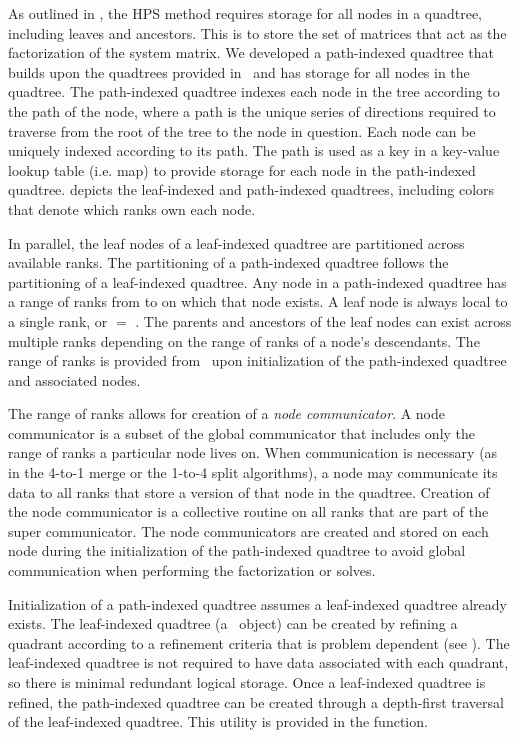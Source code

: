 As outlined in \cite{chipman2024fast}, the HPS method requires storage for all nodes in a quadtree, including leaves and ancestors. This is to store the set of matrices that act as the factorization of the system matrix. We developed a path-indexed quadtree that builds upon the quadtrees provided in \pforest\ and has storage for all nodes in the quadtree. The path-indexed quadtree indexes each node in the tree according to the path of the node, where a path is the unique series of directions required to traverse from the root of the tree to the node in question. Each node can be uniquely indexed according to its path. The path is used as a key in a key-value lookup table (i.e. map) to provide storage for each node in the path-indexed quadtree.  depicts the leaf-indexed and path-indexed quadtrees, including colors that denote which ranks own each node.

In parallel, the leaf nodes of a leaf-indexed quadtree are partitioned across available ranks. The partitioning of a path-indexed quadtree follows the partitioning of a leaf-indexed quadtree. Any node in a path-indexed quadtree has a range of ranks from \rfirst to \rlast on which that node exists. A leaf node is always local to a single rank, or \rfirst $=$ \rlast. The parents and ancestors of the leaf nodes can exist across multiple ranks depending on the range of ranks of a node's descendants. The range of ranks is provided from \pforest\ upon initialization of the path-indexed quadtree and associated nodes.

The range of ranks allows for creation of a {\em node communicator}. A node communicator is a subset of the global communicator that includes only the range of ranks a particular node lives on. When communication is necessary (as in the 4-to-1 merge or the 1-to-4 split algorithms), a node may communicate its data to all ranks that store a version of that node in the quadtree. Creation of the node communicator is a collective routine on all ranks that are part of the super communicator. The node communicators are created and stored on each node during the initialization of the path-indexed quadtree to avoid global communication when performing the factorization or solves.

Initialization of a path-indexed quadtree assumes a leaf-indexed quadtree already exists. The leaf-indexed quadtree (a \pforest\ object) can be created by refining a quadrant according to a refinement criteria that is problem dependent (see ). The leaf-indexed quadtree is not required to have data associated with each quadrant, so there is minimal redundant logical storage. Once a leaf-indexed quadtree is refined, the path-indexed quadtree can be created through a depth-first traversal of the leaf-indexed quadtree. This utility is provided in the  function.

